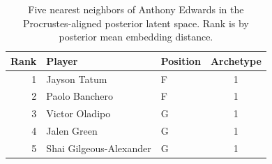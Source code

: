 \begin{table}[htbp]
  \centering\small
  \begin{tabular}{rllc}
    \toprule
    Rank & Player & Position & Archetype \\
    \midrule
    1 & Jayson Tatum & F & 1 \\
    2 & Paolo Banchero & F & 1 \\
    3 & Victor Oladipo & G & 1 \\
    4 & Jalen Green & G & 1 \\
    5 & Shai Gilgeous-Alexander & G & 1 \\
    \bottomrule
  \end{tabular}
  \caption{Five nearest neighbors of Anthony Edwards in the Procrustes-aligned posterior latent space. Rank is by posterior mean embedding distance.}
  \label{tab:Anthony_Edwards_neighbors}
\end{table}

